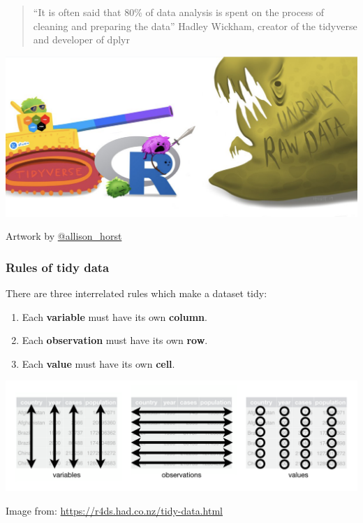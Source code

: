 \documentclass[
  openany]{book}
\providecommand{\tightlist}{%
  \setlength{\itemsep}{0pt}\setlength{\parskip}{0pt}}
\begin{document}
\begin{quote}
``It is often said that 80\% of data analysis is spent on the process of cleaning and preparing the data'' Hadley Wickham, creator of the tidyverse and developer of dplyr
\end{quote}

\begin{center}\includegraphics[width=0.7\linewidth]{images/m2/unruly} \end{center}

Artwork by \href{https://twitter.com/allison_horst}{@allison\_horst}

\hypertarget{rules-of-tidy-data}{%
\subsubsection{Rules of tidy data}\label{rules-of-tidy-data}}

There are three interrelated rules which make a dataset tidy:

\begin{enumerate}
\def\labelenumi{\arabic{enumi}.}
\tightlist
\item
  Each \textbf{variable} must have its own \textbf{column}.
\item
  Each \textbf{observation} must have its own \textbf{row}.
\item
  Each \textbf{value} must have its own \textbf{cell}.
\end{enumerate}

\begin{center}\includegraphics[width=0.7\linewidth]{images/m2/image_tidyData} \end{center}

Image from: \url{https://r4ds.had.co.nz/tidy-data.html}
\end{document}
